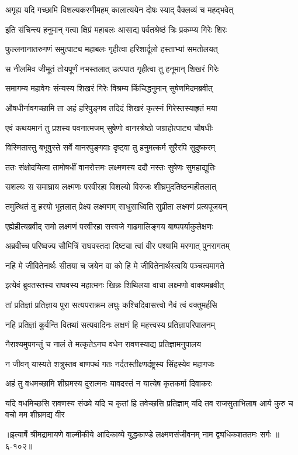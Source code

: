 \twolineshloka
{अगृह्य यदि गच्छामि विशल्यकरणीमहम्}
{कालात्ययेन दोषः स्याद् वैक्लव्यं च महद्भवेत्} %

\twolineshloka
{इति संचिन्त्य हनुमान् गत्वा क्षिप्रं महाबलः}
{आसाद्य पर्वतश्रेष्ठं त्रिः प्रकम्प्य गिरेः शिरः} %

\twolineshloka
{फुल्लनानातरुगणं समुत्पाट्य महाबलः}
{गृहीत्वा हरिशार्दूलो हस्ताभ्यां समतोलयत्} %

\twolineshloka
{स नीलमिव जीमूतं तोयपूर्णं नभस्तलात्}
{उत्पपात गृहीत्वा तु हनूमान् शिखरं गिरेः} %

\twolineshloka
{समागम्य महावेगः संन्यस्य शिखरं गिरेः}
{विश्रम्य किंचिद्धनुमान् सुषेणमिदमब्रवीत्} %

\twolineshloka
{औषधीर्नावगच्छामि ता अहं हरिपुङ्गव}
{तदिदं शिखरं कृत्स्नं गिरेस्तस्याहृतं मया} %

\twolineshloka
{एवं कथयमानं तु प्रशस्य पवनात्मजम्}
{सुषेणो वानरश्रेष्ठो जग्राहोत्पाट्य चौषधीः} %

\twolineshloka
{विस्मितास्तु बभूवुस्ते सर्वे वानरपुङ्गवाः}
{दृष्ट्वा तु हनुमत्कर्म सुरैरपि सुदुष्करम्} %

\twolineshloka
{ततः संक्षोदयित्वा तामोषधीं वानरोत्तमः}
{लक्ष्मणस्य ददौ नस्तः सुषेणः सुमहाद्युतिः} %

\twolineshloka
{सशल्यः स समाघ्राय लक्ष्मणः परवीरहा}
{विशल्यो विरुजः शीघ्रमुदतिष्ठन्महीतलात्} %

\twolineshloka
{तमुत्थितं तु हरयो भूतलात् प्रेक्ष्य लक्ष्मणम्}
{साधुसाध्विति सुप्रीता लक्ष्मणं प्रत्यपूजयन्} %

\twolineshloka
{एह्येहीत्यब्रवीद् रामो लक्ष्मणं परवीरहा}
{सस्वजे गाढमालिङ्गय बाष्पपर्याकुलेक्षणः} %

\twolineshloka
{अब्रवीच्च परिष्वज्य सौमित्रिं राघवस्तदा}
{दिष्ट्या त्वां वीर पश्यामि मरणात् पुनरागतम्} %

\twolineshloka
{नहि मे जीवितेनार्थः सीतया च जयेन वा}
{को हि मे जीवितेनार्थस्त्वयि पञ्चत्वमागते} %

\twolineshloka
{इत्येवं ब्रुवतस्तस्य राघवस्य महात्मनः}
{खिन्नः शिथिलया वाचा लक्ष्मणो वाक्यमब्रवीत्} %

\twolineshloka
{तां प्रतिज्ञां प्रतिज्ञाय पुरा सत्यपराक्रम}
{लघुः कश्चिदिवासत्त्वो नैवं त्वं वक्तुमर्हसि} %

\twolineshloka
{नहि प्रतिज्ञां कुर्वन्ति वितथां सत्यवादिनः}
{लक्षणं हि महत्त्वस्य प्रतिज्ञापरिपालनम्} %

\twolineshloka
{नैराश्यमुपगन्तुं च नालं ते मत्कृतेऽनघ}
{वधेन रावणस्याद्य प्रतिज्ञामनुपालय} %

\twolineshloka
{न जीवन् यास्यते शत्रुस्तव बाणपथं गतः}
{नर्दतस्तीक्ष्णदंष्ट्रस्य सिंहस्येव महागजः} %

\twolineshloka
{अहं तु वधमच्छामि शीघ्रमस्य दुरात्मनः}
{यावदस्तं न यात्येष कृतकर्मा दिवाकरः} %

\twolineshloka
{यदि वधमिच्छसि रावणस्य संख्ये यदि च कृतां हि तवेच्छसि प्रतिज्ञाम्}
{यदि तव राजसुताभिलाष आर्य कुरु च वचो मम शीघ्रमद्य वीर} %


॥इत्यार्षे श्रीमद्रामायणे वाल्मीकीये आदिकाव्ये युद्धकाण्डे लक्ष्मणसंजीवनम् नाम द्व्यधिकशततमः सर्गः ॥६-१०२॥
